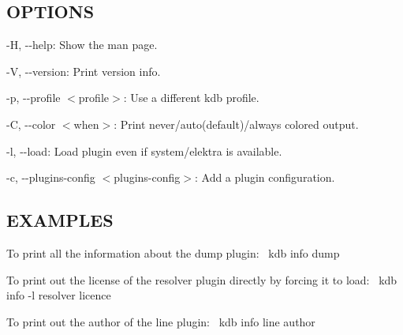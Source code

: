 \subsection*{O\+P\+T\+I\+O\+NS}


\begin{DoxyItemize}
\item {\ttfamily -\/H}, {\ttfamily -\/-\/help}\+: Show the man page.
\item {\ttfamily -\/V}, {\ttfamily -\/-\/version}\+: Print version info.
\item {\ttfamily -\/p}, {\ttfamily -\/-\/profile $<$profile$>$}\+: Use a different kdb profile.
\item {\ttfamily -\/C}, {\ttfamily -\/-\/color $<$when$>$}\+: Print never/auto(default)/always colored output.
\item {\ttfamily -\/l}, {\ttfamily -\/-\/load}\+: Load plugin even if system/elektra is available.
\item {\ttfamily -\/c}, {\ttfamily -\/-\/plugins-\/config $<$plugins-\/config$>$}\+: Add a plugin configuration.
\end{DoxyItemize}

\subsection*{E\+X\+A\+M\+P\+L\+ES}

To print all the information about the {\ttfamily dump} plugin\+:~\newline
 {\ttfamily kdb info dump}~\newline


To print out the license of the {\ttfamily resolver} plugin directly by forcing it to load\+:~\newline
 {\ttfamily kdb info -\/l resolver licence}~\newline


To print out the author of the {\ttfamily line} plugin\+:~\newline
 {\ttfamily kdb info line author}~\newline
 